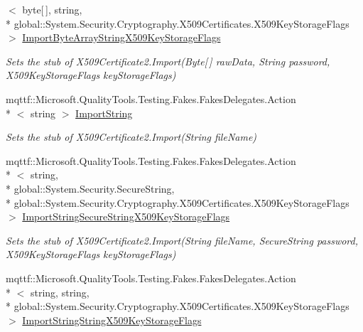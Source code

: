 \begin{DoxyCompactItemize}
$<$ byte\mbox{[}$\,$\mbox{]}, string, \\*
global\-::\-System.\-Security.\-Cryptography.\-X509\-Certificates.\-X509\-Key\-Storage\-Flags $>$ \hyperlink{class_system_1_1_security_1_1_cryptography_1_1_x509_certificates_1_1_fakes_1_1_stub_x509_certificate2_a5ee1aa30ccc1ba60b12442ef36efec17}{Import\-Byte\-Array\-String\-X509\-Key\-Storage\-Flags}
\begin{DoxyCompactList}\small\item\em Sets the stub of X509\-Certificate2.\-Import(\-Byte\mbox{[}$\,$\mbox{]} raw\-Data, String password, X509\-Key\-Storage\-Flags key\-Storage\-Flags)\end{DoxyCompactList}\item 
mqttf\-::\-Microsoft.\-Quality\-Tools.\-Testing.\-Fakes.\-Fakes\-Delegates.\-Action\\*
$<$ string $>$ \hyperlink{class_system_1_1_security_1_1_cryptography_1_1_x509_certificates_1_1_fakes_1_1_stub_x509_certificate2_aaf54439a2e5d31d5d2eff29b67d1009b}{Import\-String}
\begin{DoxyCompactList}\small\item\em Sets the stub of X509\-Certificate2.\-Import(\-String file\-Name)\end{DoxyCompactList}\item 
mqttf\-::\-Microsoft.\-Quality\-Tools.\-Testing.\-Fakes.\-Fakes\-Delegates.\-Action\\*
$<$ string, \\*
global\-::\-System.\-Security.\-Secure\-String, \\*
global\-::\-System.\-Security.\-Cryptography.\-X509\-Certificates.\-X509\-Key\-Storage\-Flags $>$ \hyperlink{class_system_1_1_security_1_1_cryptography_1_1_x509_certificates_1_1_fakes_1_1_stub_x509_certificate2_a80ec4e6d9e60648bbeb57047a42625f9}{Import\-String\-Secure\-String\-X509\-Key\-Storage\-Flags}
\begin{DoxyCompactList}\small\item\em Sets the stub of X509\-Certificate2.\-Import(\-String file\-Name, Secure\-String password, X509\-Key\-Storage\-Flags key\-Storage\-Flags)\end{DoxyCompactList}\item 
mqttf\-::\-Microsoft.\-Quality\-Tools.\-Testing.\-Fakes.\-Fakes\-Delegates.\-Action\\*
$<$ string, string, \\*
global\-::\-System.\-Security.\-Cryptography.\-X509\-Certificates.\-X509\-Key\-Storage\-Flags $>$ \hyperlink{class_system_1_1_security_1_1_cryptography_1_1_x509_certificates_1_1_fakes_1_1_stub_x509_certificate2_a748988e2ade0cbbad5074b759a9810a3}{Import\-String\-String\-X509\-Key\-Storage\-Flags}

\end{DoxyCompactItemize}
